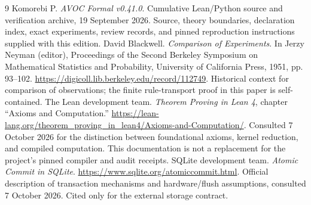\begin{thebibliography}{9}
 Komorebi P. \emph{AVOC Formal v0.41.0}. Cumulative Lean/Python source and verification archive, 19 September 2026. Source, theory boundaries, declaration index, exact experiments, review records, and pinned reproduction instructions supplied with this edition.
 David Blackwell. \emph{Comparison of Experiments}. In Jerzy Neyman (editor), Proceedings of the Second Berkeley Symposium on Mathematical Statistics and Probability, University of California Press, 1951, pp. 93--102. \url{https://digicoll.lib.berkeley.edu/record/112749}. Historical context for comparison of observations; the finite rule-transport proof in this paper is self-contained.
 The Lean development team. \emph{Theorem Proving in Lean 4}, chapter ``Axioms and Computation.'' \url{https://lean-lang.org/theorem_proving_in_lean4/Axioms-and-Computation/}. Consulted 7 October 2026 for the distinction between foundational axioms, kernel reduction, and compiled computation. This documentation is not a replacement for the project's pinned compiler and audit receipts.
 SQLite development team. \emph{Atomic Commit in SQLite}. \url{https://www.sqlite.org/atomiccommit.html}. Official description of transaction mechanisms and hardware/flush assumptions, consulted 7 October 2026. Cited only for the external storage contract.
\end{thebibliography}
